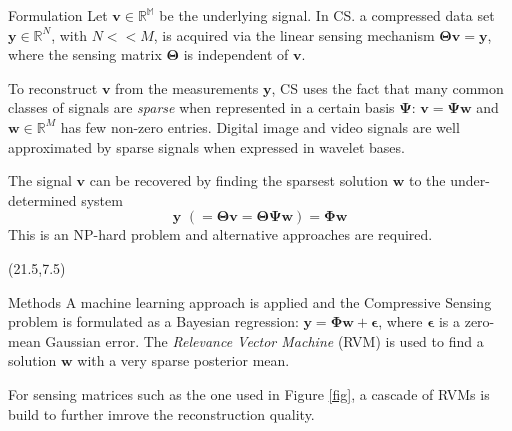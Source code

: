 \documentclass[final]{beamer}
\begin{document}
\begin{frame}{}
\begin{textblock}{19.5}
\begin{block}{Formulation}
Let $\bm v \in \mathbb{R^M}$ be the underlying signal.
In CS. a compressed data set $\bm y \in\mathbb{R}^N$, with $N<<M$, is acquired
 via the linear sensing mechanism $\bm\Theta\bm v = \bm y$, where the sensing matrix $\bm\Theta$ is independent of $\bm v$.

To reconstruct $\bm v$ from the measurements $\bm y$, CS uses the fact that many common classes of signals are \emph{sparse}
when represented in a certain basis $\bm\Psi$: $\bm v = \bm\Psi\bm w$ and $\bm w\in\mathbb{R}^M$ has few non-zero entries.
Digital image and video signals are well approximated by sparse signals when expressed in wavelet bases.

The signal $\bm v$ can be recovered by finding the sparsest solution $\bm w$ to the under-determined system
\begin{equation*}
  \bm y\,\, (=\bm\Theta\bm v = \bm\Theta\bm\Psi\bm w )= \bm\Phi\bm w 
\end{equation*}
This is an NP-hard problem and alternative approaches are required.
\end{block}


\end{textblock}


\begin{textblock}{19.5}(21.5,7.5)

\begin{block}{Methods}
A machine learning approach is applied and the Compressive Sensing problem is formulated as a Bayesian regression: $\bm y = \bm\Phi\bm w + \bm\epsilon$, where $\bm\epsilon$ is a zero-mean Gaussian error.
The \emph{Relevance Vector Machine} (RVM) \cite{tipping2001,tipping2003} is used to find a solution $\bm w$ with a 
very sparse posterior mean.

For sensing matrices such as the one used in Figure \ref{fig}, a cascade of RVMs \cite{pilikos2014} is build to further imrove the reconstruction quality.
\end{block}



\end{textblock}
\end{frame}
\end{document}
